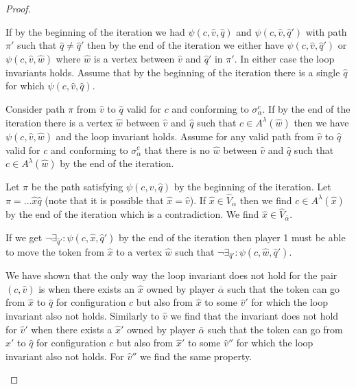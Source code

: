 \begin{theorem}
\begin{proof}
\begin{itemize}[\ \ ]
			If by the beginning of the iteration we had $\psi(c,\hat{v},\hat{q})$ and $\psi(c,\hat{v},\hat{q}')$ with path $\pi'$ such that $\hat{q} \neq \hat{q}'$ then by the end of the iteration we either have $\psi(c,\hat{v},\hat{q}')$ or $\psi(c,\hat{v},\hat{w})$ where $\hat{w}$ is a vertex between $\hat{v}$ and $\hat{q}'$ in $\pi'$. In either case the loop invariants holds. Assume that by the beginning of the iteration there is a single $\hat{q}$ for which $\psi(c,\hat{v},\hat{q})$.
			
			Consider path $\pi$ from $\hat{v}$ to $\hat{q}$ valid for $c$ and conforming to $\sigma_\alpha^c$. If by the end of the iteration there is a vertex $\hat{w}$ between $\hat{v}$ and $\hat{q}$ such that $c \in A^\lambda(\hat{w})$ then we have $\psi(c,\hat{v},\hat{w})$ and the loop invariant holds. Assume for any valid path from $\hat{v}$ to $\hat{q}$ valid for $c$ and conforming to $\sigma_\alpha^c$ that there is no $\hat{w}$ between $\hat{v}$ and $\hat{q}$ such that $c \in A^\lambda(\hat{w})$ by the end of the iteration.
			
			Let $\pi$ be the path satisfying $\psi(c,\hat{v},\hat{q})$ by the beginning of the iteration. Let $\pi = \dots\hat{x}\hat{q}$ (note that it is possible that $\hat{x} = \hat{v}$). If $\hat{x} \in \hat{V}_\alpha$ then we find $c \in A^\lambda(\hat{x})$ by the end of the iteration which is a contradiction. We find $\hat{x} \in \hat{V}_{\overline{\alpha}}$.
			
			If we get $\neg \exists_{\hat{q}'}: \psi(c,\hat{x},\hat{q}')$ by the end of the iteration then player 1 must be able to move the token from $\hat{x}$ to a vertex $\hat{w}$ such that $\neg \exists_{\hat{q}'}: \psi(c,\hat{w},\hat{q}')$.
			
			We have shown that the only way the loop invariant does not hold for the pair $(c,\hat{v})$ is when there exists an $\hat{x}$ owned by player $\overline{\alpha}$ such that the token can go from  $\hat{x}$ to $\hat{q}$ for configuration $c$ but also from $\hat{x}$ to some $\hat{v}'$ for which the loop invariant also not holds. Similarly to $\hat{v}$ we find that the invariant does not hold for $\hat{v}'$ when there exists a $\hat{x}'$ owned by player $\overline{\alpha}$ such that the token can go from $\hat{x}'$ to $\hat{q}$ for configuration $c$ but also from $\hat{x}'$ to some $\hat{v}''$ for which the loop invariant also not holds. For $\hat{v}''$ we find the same property.
			

\end{itemize}
\end{proof}
\end{theorem}
